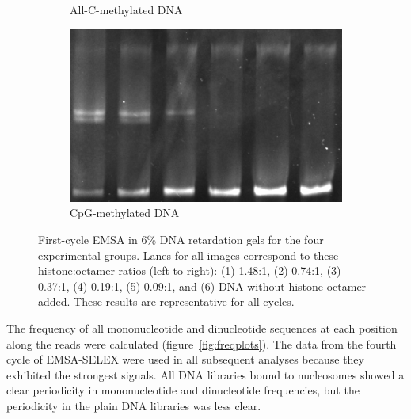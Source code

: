 \documentclass[parskip=full, numbers=noenddot]{scrreprt}
\begin{document}
\begin{figure}[htpb]
\begin{subfigure}[htpb]{0.4\textwidth}
    \caption{All-C-methylated DNA}
    \label{fig:reconstnuc_c}
  \end{subfigure}
  \begin{subfigure}[htpb]{0.4\textwidth}
    \centering
    \includegraphics[width=\textwidth]{reconstnuc_d}
    \caption{CpG-methylated DNA}
    \label{fig:reconstnuc_d}
  \end{subfigure}
  \caption{First-cycle EMSA in 6\% DNA retardation gels for the four experimental groups.  Lanes for all images correspond to these histone:octamer ratios (left to right): (1) 1.48:1, (2) 0.74:1, (3) 0.37:1, (4) 0.19:1, (5) 0.09:1, and (6) DNA without histone octamer added.  These results are representative for all cycles.}
  \label{fig:reconstnuc}
\end{figure}

The frequency of all mononucleotide and dinucleotide sequences at each position along the reads were calculated (figure~\ref{fig:freqplots}).  The data from the fourth cycle of EMSA-SELEX were used in all subsequent analyses because they exhibited the strongest signals.  All DNA libraries bound to nucleosomes showed a clear periodicity in mononucleotide and dinucleotide frequencies, but the periodicity in the plain DNA libraries was less clear.
\end{document}
